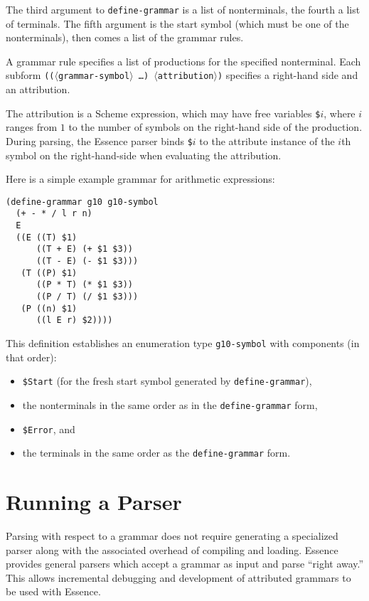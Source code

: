 \documentclass{article}
\newcommand{\meta}[1]{{\noindent\mbox{\textrm{$\langle$#1$\rangle$}}}}
\newcommand{\dotsfoo}{\ldots\texonly{\thinspace}}
\newcommand{\codefont}[1]{\texttt{#1}}
\begin{document}
The third argument to \codefont{define-grammar} is a list of
nonterminals, the fourth a list of terminals.  The fifth argument is
the start symbol (which must be one of the nonterminals), then comes a
list of the grammar rules.

A grammar rule specifies a list of productions for the specified
nonterminal.  Each subform \texttt{((\meta{grammar-symbol} \dotsfoo)
  \meta{attribution})}
specifies a right-hand side and an attribution.

The attribution is a Scheme expression, which may have free variables
\codefont{\$}$i$, where $i$ ranges from $1$ to the number of symbols
on the right-hand side of the production.  During parsing, the Essence
parser binds \codefont{\$}$i$ to the attribute instance of the $i$th
symbol on the right-hand-side when evaluating the attribution.

Here is a simple example grammar for arithmetic expressions:
%
\begin{verbatim}
(define-grammar g10 g10-symbol
  (+ - * / l r n)
  E
  ((E ((T) $1)
      ((T + E) (+ $1 $3))
      ((T - E) (- $1 $3)))
   (T ((P) $1)
      ((P * T) (* $1 $3))
      ((P / T) (/ $1 $3)))
   (P ((n) $1)
      ((l E r) $2))))
\end{verbatim}
%
This definition establishes an enumeration type \codefont{g10-symbol}
with components (in that order):
%
\label{list:grammar-enum}
%
\begin{itemize}
\item \codefont{\$Start} (for the fresh start symbol generated by
  \codefont{define-grammar}),
\item the nonterminals in the same order as in the
  \codefont{define-grammar} form,
\item \codefont{\$Error}, and
\item the terminals in the same order as the \codefont{define-grammar}
  form.
\end{itemize}

\section{Running a Parser}
\label{sec:running-a-parser}

Parsing with respect to a grammar does not require generating a
specialized parser along with the associated overhead of compiling and
loading.  Essence provides general parsers which accept a grammar as
input and parse ``right away.''  This allows incremental debugging and 
development of attributed grammars to be used with Essence.
\end{document}
